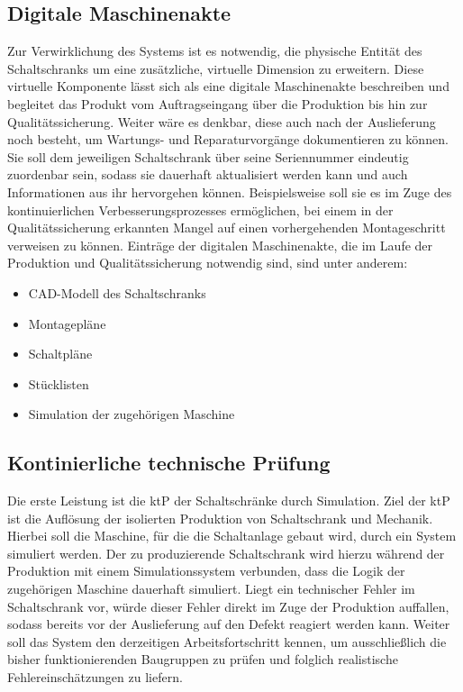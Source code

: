 \documentclass[
    type=Projektarbeit,
    status=draft, %
    language=german, %
    bibengine=bibtex,
]{unibwm-inf-thesis}
\begin{document}
    \subsection{Digitale Maschinenakte}\label{subsec:digitale-maschinenakte}
    Zur Verwirklichung des Systems ist es notwendig, die physische Entität des Schaltschranks um eine zusätzliche,
    virtuelle Dimension zu erweitern.
    Diese virtuelle Komponente lässt sich als eine digitale Maschinenakte beschreiben und begleitet das Produkt vom
    Auftragseingang über die Produktion bis hin zur Qualitätssicherung.
    Weiter wäre es denkbar, diese auch nach der Auslieferung noch besteht, um Wartungs- und Reparaturvorgänge
    dokumentieren zu können.
    Sie soll dem jeweiligen Schaltschrank über seine Seriennummer eindeutig zuordenbar sein, sodass sie dauerhaft
    aktualisiert werden kann und auch Informationen aus ihr hervorgehen können.
    Beispielsweise soll sie es im Zuge des kontinuierlichen Verbesserungsprozesses ermöglichen, bei einem in der
    Qualitätssicherung erkannten Mangel auf einen vorhergehenden Montageschritt verweisen zu können.
    Einträge der digitalen Maschinenakte, die im Laufe der Produktion und Qualitätssicherung notwendig sind, sind unter
    anderem:
    \begin{itemize}
        \item CAD-Modell des Schaltschranks
        \item Montagepläne
        \item Schaltpläne
        \item Stücklisten
        \item Simulation der zugehörigen Maschine
    \end{itemize}



    \subsection{Kontinierliche technische Prüfung}\label{subsec:kontinierliche-technische-prufung}
    Die erste Leistung ist die \ac{ktP} der Schaltschränke durch Simulation.
    Ziel der \ac{ktP} ist die Auflösung der isolierten Produktion von Schaltschrank und Mechanik.
    Hierbei soll die Maschine, für die die Schaltanlage gebaut wird, durch ein System simuliert werden.
    Der zu produzierende Schaltschrank wird hierzu während der Produktion mit einem Simulationssystem verbunden, dass die Logik der zugehörigen Maschine dauerhaft simuliert.
    Liegt ein technischer Fehler im Schaltschrank vor, würde dieser Fehler direkt im Zuge der Produktion auffallen, sodass bereits vor der Auslieferung auf den Defekt reagiert werden kann.
    Weiter soll das System den derzeitigen Arbeitsfortschritt kennen, um ausschließlich die bisher funktionierenden Baugruppen zu prüfen und folglich realistische Fehlereinschätzungen zu liefern.
\end{document}
